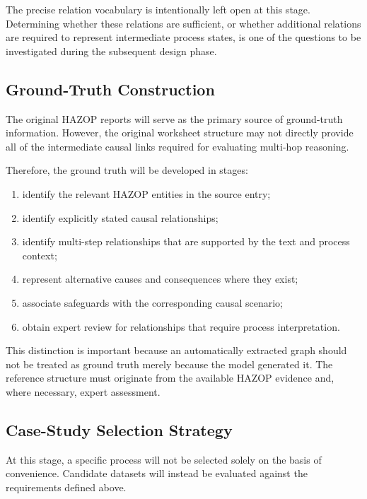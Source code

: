 The precise relation vocabulary is intentionally left open at this
stage. Determining whether these relations are sufficient, or whether
additional relations are required to represent intermediate process
states, is one of the questions to be investigated during the
subsequent design phase.

\subsection{Ground-Truth Construction}

The original HAZOP reports will serve as the primary source of
ground-truth information. However, the original worksheet structure
may not directly provide all of the intermediate causal links required
for evaluating multi-hop reasoning.

Therefore, the ground truth will be developed in stages:

\begin{enumerate}[label=\textbf{\arabic*.}]
    \item identify the relevant HAZOP entities in the source entry;
    \item identify explicitly stated causal relationships;
    \item identify multi-step relationships that are supported by the
    text and process context;
    \item represent alternative causes and consequences where they
    exist;
    \item associate safeguards with the corresponding causal scenario;
    \item obtain expert review for relationships that require process
    interpretation.
\end{enumerate}

This distinction is important because an automatically extracted graph
should not be treated as ground truth merely because the model
generated it. The reference structure must originate from the
available HAZOP evidence and, where necessary, expert assessment.

\subsection{Case-Study Selection Strategy}

At this stage, a specific process will not be selected solely on the
basis of convenience. Candidate datasets will instead be evaluated
against the requirements defined above.


